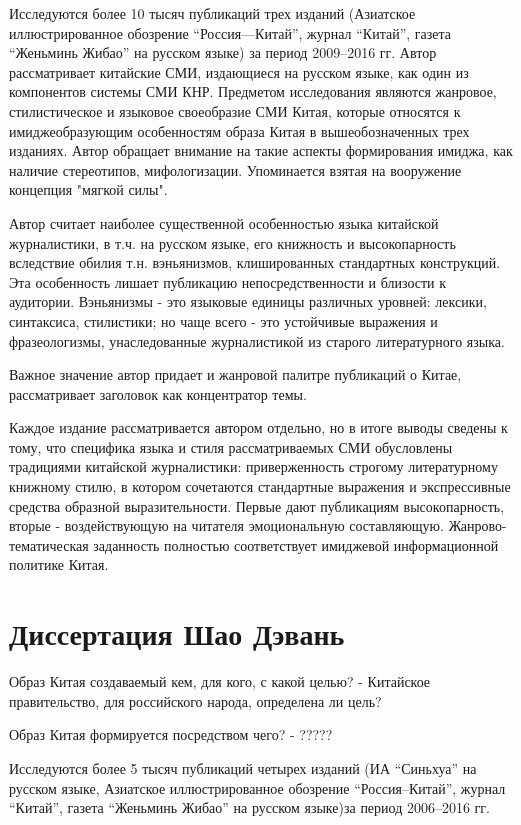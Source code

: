 \documentclass[11pt]{article}
\begin{document}
Исследуются более 10 тысяч публикаций трех изданий (Азиатское иллюстрированное обозрение ``Россия---Китай'', журнал ``Китай'', газета ``Женьминь Жибао'' на русском языке) за период 2009--2016 гг.
Автор рассматривает китайские СМИ, издающиеся на русском языке, как один из компонентов системы СМИ КНР.
Предметом исследования являются жанровое, стилистическое и языковое своеобразие СМИ Китая, которые относятся к имиджеобразующим особенностям образа Китая в вышеобозначенных трех изданиях.
Автор обращает внимание на такие аспекты формирования имиджа, как наличие стереотипов, мифологизации.
Упоминается взятая на вооружение концепция "мягкой силы".

Автор считает наиболее существенной особенностью языка китайской журналистики, в т.ч. на русском языке, его книжность и высокопарность вследствие обилия т.н. вэньянизмов, клишированных стандартных конструкций.
Эта особенность лишает публикацию непосредственности и близости к аудитории.
Вэньянизмы - это языковые единицы различных уровней: лексики, синтаксиса, стилистики;
но чаще всего - это устойчивые выражения и фразеологизмы, унаследованные журналистикой из старого литературного языка.

Важное значение автор придает и жанровой палитре публикаций о Китае, рассматривает заголовок как концентратор темы.

Каждое издание рассматривается автором отдельно, но в итоге выводы сведены к тому, что специфика языка и стиля рассматриваемых СМИ обусловлены традициями китайской журналистики:
приверженность строгому литературному книжному стилю, в котором сочетаются стандартные выражения и экспрессивные средства образной выразительности.
Первые дают публикациям высокопарность, вторые - воздействующую на читателя эмоциональную составляющую.
Жанрово-тематическая заданность полностью соответствует имиджевой информационной политике Китая.

\section{Диссертация Шао Дэвань}\label{sec:section-shaodewan}

Образ Китая создаваемый кем, для кого, с какой целью?
- Китайское правительство, для российского народа, определена ли цель?

Образ Китая формируется посредством чего?
- ?????

Исследуются более 5 тысяч публикаций четырех изданий (ИА ``Синьхуа'' на русском языке, Азиатское иллюстрированное обозрение ``Россия--Китай'', журнал ``Китай'', газета ``Женьминь Жибао'' на русском языке)за период 2006--2016 гг.
\end{document}
